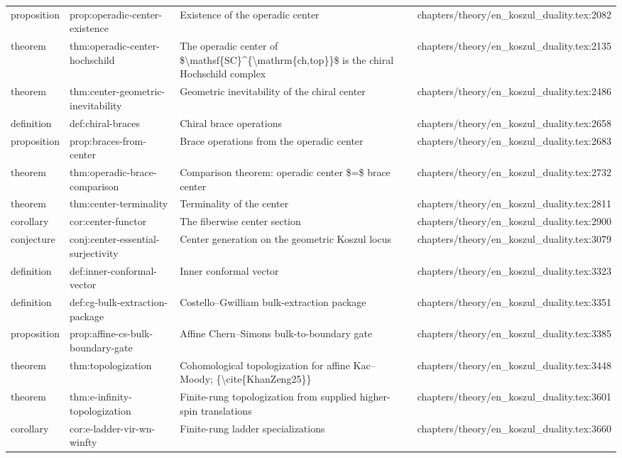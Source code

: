 \documentclass[11pt]{article}
\begin{document}
\begin{longtable}{L{0.10\textwidth}L{0.26\textwidth}L{0.42\textwidth}L{0.22\textwidth}}
proposition & prop:operadic-center-existence & Existence of the operadic center & chapters/theory/en\_koszul\_duality.tex:2082\\
theorem & thm:operadic-center-hochschild & The operadic center of \$\textbackslash{}mathsf\{SC\}\textasciicircum{}\{\textbackslash{}mathrm\{ch,top\}\}\$ is the chiral Hochschild complex & chapters/theory/en\_koszul\_duality.tex:2135\\
theorem & thm:center-geometric-inevitability & Geometric inevitability of the chiral center & chapters/theory/en\_koszul\_duality.tex:2486\\
definition & def:chiral-braces & Chiral brace operations & chapters/theory/en\_koszul\_duality.tex:2658\\
proposition & prop:braces-from-center & Brace operations from the operadic center & chapters/theory/en\_koszul\_duality.tex:2683\\
theorem & thm:operadic-brace-comparison & Comparison theorem: operadic center \$=\$ brace center & chapters/theory/en\_koszul\_duality.tex:2732\\
theorem & thm:center-terminality & Terminality of the center & chapters/theory/en\_koszul\_duality.tex:2811\\
corollary & cor:center-functor & The fiberwise center section & chapters/theory/en\_koszul\_duality.tex:2900\\
conjecture & conj:center-essential-surjectivity & Center generation on the geometric Koszul locus & chapters/theory/en\_koszul\_duality.tex:3079\\
definition & def:inner-conformal-vector & Inner conformal vector & chapters/theory/en\_koszul\_duality.tex:3323\\
definition & def:cg-bulk-extraction-package & Costello--Gwilliam bulk-extraction package & chapters/theory/en\_koszul\_duality.tex:3351\\
proposition & prop:affine-cs-bulk-boundary-gate & Affine Chern--Simons bulk-to-boundary gate & chapters/theory/en\_koszul\_duality.tex:3385\\
theorem & thm:topologization & Cohomological topologization for affine Kac--Moody; \{\textbackslash{}cite\{KhanZeng25\}\} & chapters/theory/en\_koszul\_duality.tex:3448\\
theorem & thm:e-infinity-topologization & Finite-rung topologization from supplied higher-spin translations & chapters/theory/en\_koszul\_duality.tex:3601\\
corollary & cor:e-ladder-vir-wn-winfty & Finite-rung ladder specializations & chapters/theory/en\_koszul\_duality.tex:3660\\

\end{longtable}
\end{document}
